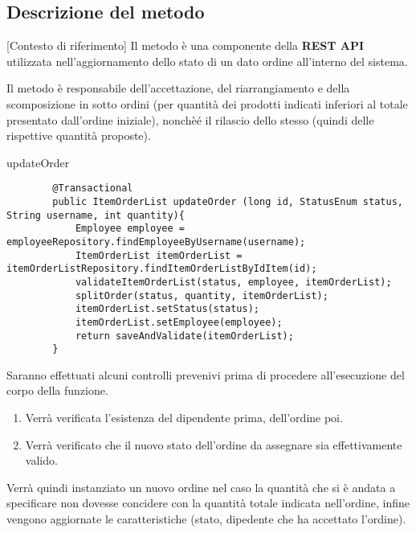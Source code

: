 \subsection{Descrizione del metodo}[Contesto di riferimento]
Il metodo  è una componente della \textbf{REST API} utilizzata nell'aggiornamento
dello stato di un dato ordine all'interno del sistema.

Il metodo è responsabile dell'accettazione, del riarrangiamento e della scomposizione in sotto ordini (per quantità 
dei prodotti indicati inferiori al totale presentato dall'ordine iniziale), nonchèé il rilascio dello stesso (quindi
delle rispettive quantità proposte).

\begin{elsrc}{updateOrder}
	\begin{verbatim}
		@Transactional
		public ItemOrderList updateOrder (long id, StatusEnum status, String username, int quantity){
			Employee employee = employeeRepository.findEmployeeByUsername(username);
			ItemOrderList itemOrderList = itemOrderListRepository.findItemOrderListByIdItem(id);
			validateItemOrderList(status, employee, itemOrderList);
			splitOrder(status, quantity, itemOrderList);
			itemOrderList.setStatus(status);
			itemOrderList.setEmployee(employee);
			return saveAndValidate(itemOrderList);
		}
	\end{verbatim}
\end{elsrc}

Saranno effettuati alcuni controlli prevenivi prima di procedere all'esecuzione del corpo della funzione.
\begin{enumerate}
	\item Verrà verificata l'esistenza del dipendente prima, dell'ordine poi.
	\item Verrà verificato che il nuovo stato dell'ordine da assegnare sia effettivamente valido.
\end{enumerate}

Verrà quindi instanziato un nuovo ordine nel caso la quantità che si è andata a specificare
non dovesse concidere con la quantità totale indicata nell'ordine, infine vengono aggiornate le 
caratteristiche (stato, dipedente che ha accettato l'ordine).

\newpage
